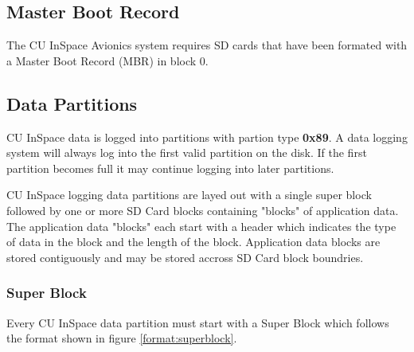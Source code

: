\subsection{Master Boot Record}

The CU InSpace Avionics system requires SD cards that have been formated with a
Master Boot Record (MBR) in block 0. 

\subsection{Data Partitions}

CU InSpace data is logged into partitions with partion type \textbf{0x89}. A
data logging system will always log into the first valid partition on the disk.
If the first partition becomes full it may continue logging into later
partitions.

CU InSpace logging data partitions are layed out with a single super block
followed by one or more SD Card blocks containing "blocks" of application data.
The application data "blocks" each start with a header which indicates the type
of data in the block and the length of the block. Application data blocks are
stored contiguously and may be stored accross SD Card block boundries.

\subsubsection{Super Block}

Every CU InSpace data partition must start with a Super Block which follows the
format shown in figure \ref{format:superblock}.

